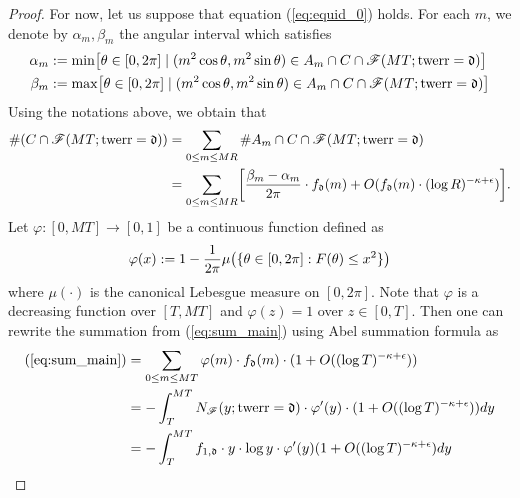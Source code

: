 \documentclass[12pt]{amsart}
\numberwithin{equation}{section} %
\theoremstyle{definition} \newtheorem{definition}[counter]{Definition}
\theoremstyle{remark} \newtheorem{nonexam}[counter]{Non-example}
\newcommand{\FF}{\mathscr{F}} %
\let\originalleft\left \let\originalright\right
\renewcommand{\left}{\mathopen{}\mathclose\bgroup\originalleft}
\renewcommand{\right}{\aftergroup\egroup\originalright}
\DeclareMathOperator{\twerr}{twerr} %
\begin{document}
\begin{proof}
    For now, let us suppose that equation (\ref{eq:equid_0}) holds. For each $m$, we denote by $\alpha_m, \beta_m$ the angular interval which satisfies
    \begin{align}
        \begin{split}
            \alpha_m &:= \min\left[ \theta \in [0,2\pi] \; | \; (m^2 \cos \theta, m^2 \sin \theta) \in A_m \cap C \cap \FF(MT; \twerr = \mathfrak{d}) \right] \\
            \beta_m &:= \max\left[ \theta \in [0,2\pi] \; | \; (m^2 \cos \theta, m^2 \sin \theta) \in A_m \cap C \cap \FF(MT; \twerr = \mathfrak{d}) \right] 
        \end{split}
    \end{align} 
    Using the notations above, we obtain that
    \begin{align} \label{eq:sum_main}
    \begin{split}
        \#(C \cap \FF(MT; \twerr = \mathfrak{d})) &= \sum_{0 \leq m \leq M R} \# A_m \cap C \cap \FF(MT; \twerr = \mathfrak{d}) \\
        &= \sum_{0 \leq m \leq M R} \left[\frac{\beta_m - \alpha_m}{2\pi} \cdot f_\mathfrak{d}(m) + O(f_\mathfrak{d}(m) \cdot (\log R)^{-\kappa + \epsilon}) \right].
    \end{split}
    \end{align}
    Let $\varphi: [0,MT] \to [0,1]$ be a continuous function defined as
    \begin{equation*}
        \varphi(x) := 1 - \frac{1}{2\pi} \mu \left(\{ \theta \in [0,2\pi] : F(\theta) \leq x^2 \} \right)
    \end{equation*}
    where $\mu(\cdot)$ is the canonical Lebesgue measure on $[0,2\pi]$. Note that $\varphi$ is a decreasing function over $[T,MT]$ and $\varphi(z) = 1$ over $z \in [0,T]$.
    Then one can rewrite the summation from (\ref{eq:sum_main}) using Abel summation formula as
    \begin{align}
        \begin{split}
            (\ref{eq:sum_main}) &= \sum_{0 \leq m \leq MT} \varphi(m) \cdot f_\mathfrak{d}(m) \cdot (1 + O((\log T)^{- \kappa + \epsilon})) \\
            &= - \int_{T}^{MT} N_{\FF}(y; \twerr = \mathfrak{d}) \cdot \varphi'(y) \cdot (1 + O((\log T)^{- \kappa + \epsilon})) dy \\
            &= -\int_T^{MT} f_{1,\mathfrak{d}} \cdot y \cdot \log y \cdot \varphi'(y) (1 + O((\log T)^{- \kappa + \epsilon}) dy
        \end{split}

\end{align}
\end{proof}
\end{document}
